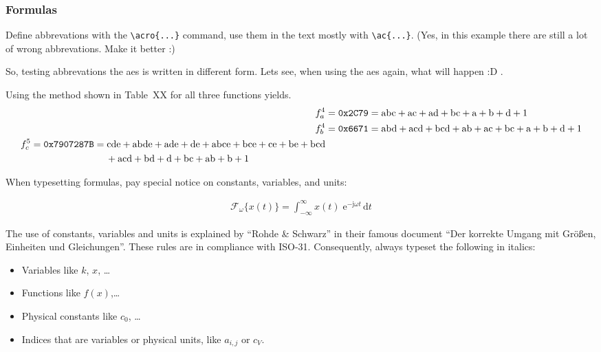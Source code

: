 \subsubsection{Formulas}

Define abbrevations with the \verb+\acro{...}+ command, use them in the text mostly with \verb+\ac{...}+. (Yes, in this example there are still a lot of wrong abbrevations. Make it better :)

So, testing abbrevations the \gls{aes} is written in different form. Lets see, when using the \gls{aes} again, what will happen :D .

Using the method shown in Table~XX for all three functions yields.
\begin{align}
f_a^4 &= \mathrm{\texttt{0x2C79}} = \mathrm{abc} + \mathrm{ac} + \mathrm{ad} + \mathrm{bc} + \mathrm{a} + \mathrm{b} + \mathrm{d} + \mathrm{1} \\
f_b^4 &= \mathrm{\texttt{0x6671}} = \mathrm{abd} + \mathrm{acd} + \mathrm{bcd} + \mathrm{ab} + \mathrm{ac} + \mathrm{bc} + \mathrm{a} + \mathrm{b} + \mathrm{d} + \mathrm{1}\\
\begin{split}
f_c^5 &= \mathrm{\texttt{0x7907287B}} = \mathrm{cde} + \mathrm{abde} + \mathrm{ade} + \mathrm{de} + \mathrm{abce} + \mathrm{bce} + \mathrm{ce} + \mathrm{be} + \mathrm{bcd}\\
&\hspace{2.75cm}+ \mathrm{acd} +\mathrm{bd} + \mathrm{d} + \mathrm{bc} + \mathrm{ab} + \mathrm{b} + \mathrm{1}
\end{split}
\end{align}

When typesetting formulas, pay special notice on constants, variables, and units:

 \begin{align}
  \mathcal{F}_{\omega}\{x(t)\} = \int^{\infty}_{-\infty} x(t) \;\mathrm{e}^{-\mathrm{j} \omega t}\,\mathrm{d}t
  \tag{Fourier-Transformation} %
  \end{align}
  
The use of constants, variables and units is explained by \enquote{Rohde \& Schwarz} in their famous document \enquote{Der korrekte Umgang mit Gr\"{o}\ss{}en, Einheiten und Gleichungen}. These rules are in compliance with ISO-31. Consequently, always typeset the following in italics:

\begin{itemize}
\item Variables like $k$, $x$, \dots
\item Functions like $f(x)$,\dots
\item Physical constants like $c_0$, \dots
\item Indices that are variables or physical units, like $a_{i, j}$ or $c_V$.
\end{itemize}

